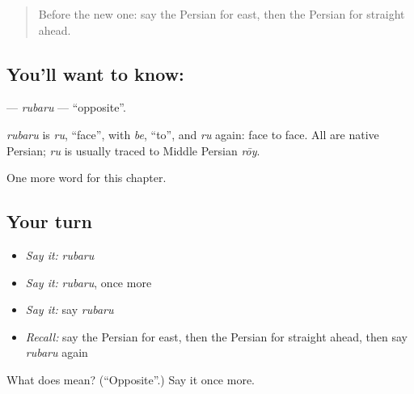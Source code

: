 \begin{quote}
Before the new one: say the Persian for east, then the Persian for straight ahead.
\end{quote}

\subsection*{You'll want to know: }
\textbf{} — \emph{rubaru} — \textquotedblleft{}opposite\textquotedblright{}.

\begin{cousinweb}
\emph{rubaru} is \emph{ru}, \textquotedblleft{}face\textquotedblright{}, with \emph{be}, \textquotedblleft{}to\textquotedblright{}, and \emph{ru} again: face to face. All are native Persian; \emph{ru} is usually traced to Middle Persian \emph{rōy}.
\end{cousinweb}

\begin{grammarlens}[title={What you've built}]
One more word for this chapter.
\end{grammarlens}

\subsection*{Your turn}
\begin{itemize}
\raggedright
  \item \emph{Say it:} \emph{rubaru}
  \item \emph{Say it:} \emph{rubaru}, once more
  \item \emph{Say it:} say \emph{rubaru}
  \item \emph{Recall:} say the Persian for east, then the Persian for straight ahead, then say \emph{rubaru} again
\end{itemize}

\begin{tcolorbox}[breakable,colback=teal!4,colframe=teal!35!black,title={Before you move on}]
What does  mean? (\textquotedblleft{}Opposite\textquotedblright{}.) Say it once more.
\end{tcolorbox}
